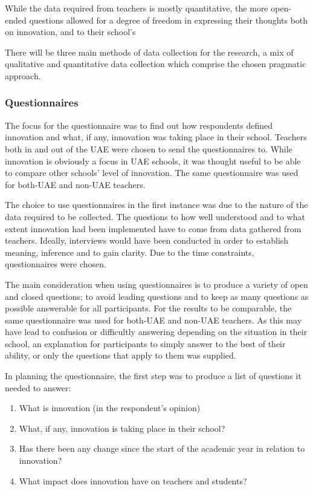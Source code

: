 While the data required from teachers is mostly quantitative, the more open-ended questions allowed for a degree of freedom in expressing their thoughts both on innovation, and to their school's 

There will be three main methods of data collection for the research, a mix of qualitative and quantitative data collection which comprise the chosen pragmatic approach.

\subsubsection{Questionnaires}

The focus for the questionnaire was to find out how respondents defined innovation and what, if any, innovation was taking place in their school. Teachers both in and out of the UAE were chosen to send the questionnaires to. While innovation is obviously a focus in UAE schools, it was thought useful to be able to compare other schools' level of innovation. The same questionnaire was used for both-UAE and non-UAE teachers. 

The choice to use questionnaires in the first instance was due to the nature of the data required to be collected. The questions to how well understood and to what extent innovation had been implemented have to come from data gathered from teachers. Ideally, interviews would have been conducted in order to establish meaning, inference and to gain clarity. Due to the time constraints, questionnaires were chosen. 

The main consideration when using questionnaires is to produce a variety of open and closed questions; to avoid leading questions and to keep as many questions as possible answerable for all participants. For the results to be comparable, the same questionnaire was used for both-UAE and non-UAE teachers.  As this may have lead to confusion or difficultly answering depending on the situation in their school, an explanation for participants to simply answer to the best of their ability, or only the questions that apply to them was supplied.

In planning the questionnaire, the first step was to produce a list of questions it needed to answer:

\begin{enumerate}
\item What is innovation (in the respondent's opinion)
\item What, if any, innovation is taking place in their school?
\item Has there been any change since the start of the academic year in relation to innovation?
\item What impact does innovation have on teachers and students?
\end{enumerate}

